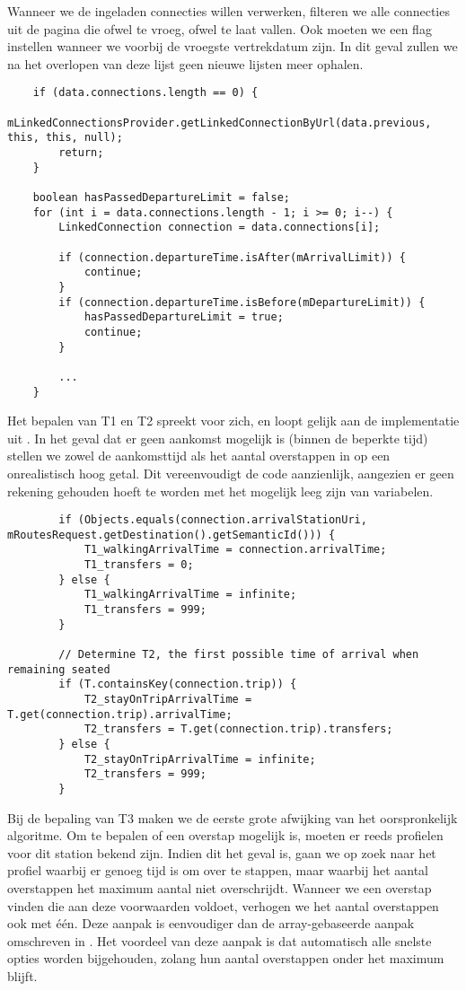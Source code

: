 Wanneer we de ingeladen connecties willen verwerken, filteren we alle connecties uit de pagina die ofwel te vroeg, ofwel te laat vallen. Ook moeten we een flag instellen wanneer we voorbij de vroegste vertrekdatum zijn. In dit geval zullen we na het overlopen van deze lijst geen nieuwe lijsten meer ophalen.

\begin{code}
\begin{verbatim}
	if (data.connections.length == 0) {
		mLinkedConnectionsProvider.getLinkedConnectionByUrl(data.previous, this, this, null);
		return;
	}
	
	boolean hasPassedDepartureLimit = false;
	for (int i = data.connections.length - 1; i >= 0; i--) {
		LinkedConnection connection = data.connections[i];
		
		if (connection.departureTime.isAfter(mArrivalLimit)) {
			continue;
		}
		if (connection.departureTime.isBefore(mDepartureLimit)) {
			hasPassedDepartureLimit = true;
			continue;
		}
		
		...
	}
	\end{verbatim}
\end{code}

Het bepalen van T1 en T2 spreekt voor zich, en loopt gelijk aan de implementatie uit \cite{strasser17}. In het geval dat er geen aankomst mogelijk is (binnen de beperkte tijd) stellen we zowel de aankomsttijd als het aantal overstappen in op een onrealistisch hoog getal. Dit vereenvoudigt de code aanzienlijk, aangezien er geen rekening gehouden hoeft te worden met het mogelijk leeg zijn van variabelen.
\begin{code}
	\begin{verbatim}
	 	if (Objects.equals(connection.arrivalStationUri, mRoutesRequest.getDestination().getSemanticId())) {
			T1_walkingArrivalTime = connection.arrivalTime;
			T1_transfers = 0;
		} else {
			T1_walkingArrivalTime = infinite;
			T1_transfers = 999;
		}

		// Determine T2, the first possible time of arrival when remaining seated
		if (T.containsKey(connection.trip)) {
			T2_stayOnTripArrivalTime = T.get(connection.trip).arrivalTime;
			T2_transfers = T.get(connection.trip).transfers;
		} else {
			T2_stayOnTripArrivalTime = infinite;
			T2_transfers = 999;
		}	
		\end{verbatim}
\end{code}

Bij de bepaling van T3 maken we de eerste grote afwijking van het oorspronkelijk algoritme. Om te bepalen of een overstap mogelijk is, moeten er reeds profielen voor dit station bekend zijn. Indien dit het geval is, gaan we op zoek naar het profiel waarbij er genoeg tijd is om over te stappen, maar waarbij het aantal overstappen het maximum aantal niet overschrijdt. 
Wanneer we een overstap vinden die aan deze voorwaarden voldoet, verhogen we het aantal overstappen ook met één. Deze aanpak is eenvoudiger dan de array-gebaseerde aanpak omschreven in \cite{strasser17}. Het voordeel van deze aanpak is dat automatisch alle snelste opties worden bijgehouden, zolang hun aantal overstappen onder het maximum blijft. 

